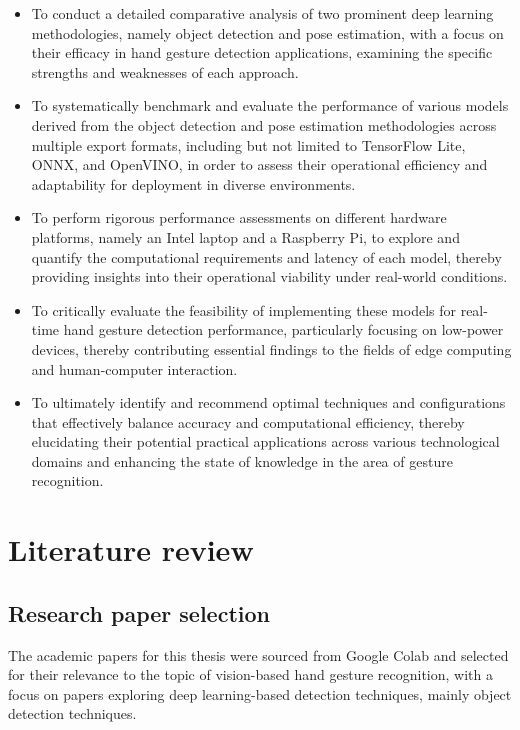 \documentclass[12pt]{article}
\begin{document}
\begin{itemize}
    \item To conduct a detailed comparative analysis of two prominent deep learning methodologies, namely object detection and pose estimation, with a focus on their efficacy in hand gesture detection applications, examining the specific strengths and weaknesses of each approach.
    \item To systematically benchmark and evaluate the performance of various models derived from the object detection and pose estimation methodologies across multiple export formats, including but not limited to TensorFlow Lite, ONNX, and OpenVINO, in order to assess their operational efficiency and adaptability for deployment in diverse environments.
    \item To perform rigorous performance assessments on different hardware platforms, namely an Intel laptop and a Raspberry Pi, to explore and quantify the computational requirements and latency of each model, thereby providing insights into their operational viability under real-world conditions.
    \item To critically evaluate the feasibility of implementing these models for real-time hand gesture detection performance, particularly focusing on low-power devices, thereby contributing essential findings to the fields of edge computing and human-computer interaction.
    \item To ultimately identify and recommend optimal techniques and configurations that effectively balance accuracy and computational efficiency, thereby elucidating their potential practical applications across various technological domains and enhancing the state of knowledge in the area of gesture recognition.
\end{itemize}

\section{Literature review}

\subsection{Research paper selection}

The academic papers for this thesis were sourced from Google Colab and selected for their relevance to the topic of vision-based hand gesture recognition, with a focus on papers exploring deep learning-based detection techniques, mainly object detection techniques.
\end{document}
